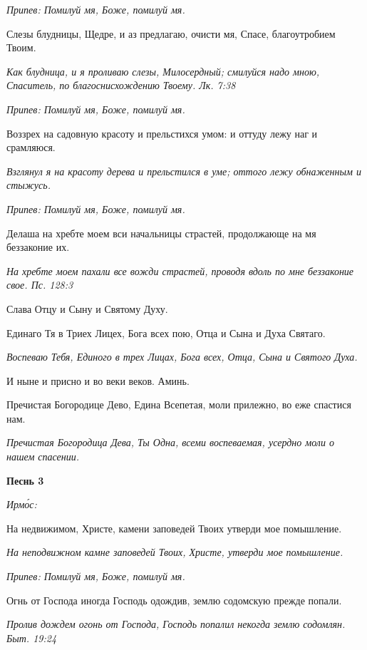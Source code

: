 \itshape Припев:\normalfont{} Помилуй мя, Боже, помилуй мя.


Слезы блудницы, Щедре, и аз предлагаю, очисти мя, Спасе, благоутробием Твоим.


\itshape Как блудница, и я проливаю слезы, Милосердный; смилуйся надо мною, Спаситель, по благоснисхождению Твоему. Лк. 7:38\normalfont{}


\itshape Припев:\normalfont{} Помилуй мя, Боже, помилуй мя.


Воззрех на садовную красоту и прельстихся умом: и оттуду лежу наг и срамляюся.


\itshape Взглянул я на красоту дерева и прельстился в уме; оттого лежу обнаженным и стыжусь.\normalfont{}


\itshape Припев:\normalfont{} Помилуй мя, Боже, помилуй мя.


Делаша на хребте моем вси начальницы страстей, продолжающе на мя беззаконие их.


\itshape На хребте моем пахали все вожди страстей, проводя вдоль по мне беззаконие свое. Пс. 128:3\normalfont{}


Слава Отцу и Сыну и Святому Духу.


Единаго Тя в Триех Лицех, Бога всех пою, Отца и Сына и Духа Святаго.


\itshape Воспеваю Тебя, Единого в трех Лицах, Бога всех, Отца, Сына и Святого Духа.\normalfont{}


И ныне и присно и во веки веков. Аминь.


Пречистая Богородице Дево, Едина Всепетая, моли прилежно, во еже спастися нам.


\itshape Пречистая Богородица Дева, Ты Одна, всеми воспеваемая, усердно моли о нашем спасении.\normalfont{}





\bfseries Песнь 3\normalfont{}


\itshape Ирмо́с:\normalfont{}


На недвижимом, Христе, камени заповедей Твоих утверди мое помышление.


\itshape На неподвижном камне заповедей Твоих, Христе, утверди мое помышление.\normalfont{}


\itshape Припев:\normalfont{} Помилуй мя, Боже, помилуй мя.


Огнь от Господа иногда Господь одождив, землю содомскую прежде попали.


\itshape Пролив дождем огонь от Господа, Господь попалил некогда землю содомлян. Быт. 19:24\normalfont{}


